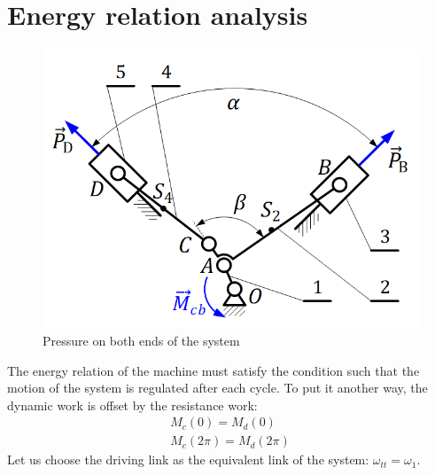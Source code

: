 \clearpage
\section{Energy relation analysis}
\begin{figure}[h]
	\centering
	\includegraphics[width=0.4\linewidth]{12}
	\caption{Pressure on both ends of the system}
	\label{fig:12}
\end{figure}
The energy relation of the machine must satisfy the condition such that the motion of the system is regulated after each cycle. To put it another way, the dynamic work is offset by the resistance work: 
\begin{equation}\label{condition}
	\begin{array}{c}
	M_{c}(0)=M_{d}(0)\\
	M_{c}(2\pi)=M_{d}(2\pi)
	\end{array}
\end{equation}
Let us choose the driving link as the equivalent link of the system: $ \omega_{tt}=\omega_1 $.
